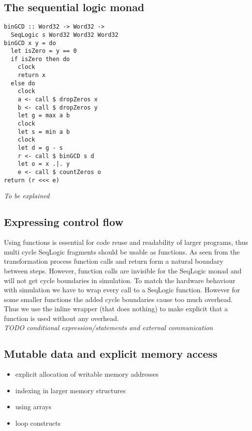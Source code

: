 \documentclass[preprint]{sigplanconf}
\begin{document}
\subsection{The sequential logic monad}

\begin{lstlisting}
binGCD :: Word32 -> Word32 -> 
  SeqLogic s Word32 Word32 Word32
binGCD x y = do
  let isZero = y == 0
  if isZero then do
    clock
    return x
  else do
    clock
    a <- call $ dropZeros x
    b <- call $ dropZeros y
    let g = max a b
    clock
    let s = min a b
    clock
    let d = g - s
    r <- call $ binGCD s d
    let o = x .|. y
    e <- call $ countZeros o
return (r <<< e)
\end{lstlisting}

\textit{To be explained}

\subsection{Expressing control flow}
Using functions is essential for code reuse and readability of larger programs, thus multi cycle SeqLogic fragments should be usable as functions.
As seen from the transformation process function calls and return form a natural boundary between steps.
However, function calls are invisible for the SeqLogic monad and will not get cycle boundaries in simulation.
To match the hardware behaviour with simulation we have to wrap every call to a SeqLogic function.
However for some smaller functions the added cycle boundaries cause too much overhead.
Thus we use the inline wrapper (that does nothing) to make explicit that a function is used without any overhead. \\

\textit {TODO conditional expression/statements and external communication}

\subsection{Mutable data and explicit memory access}
\begin{itemize}
  \item explicit allocation of writable memory addresses
  \item indexing in larger memory structures
  \item using arrays
  \item loop constructs
\end{itemize}
\end{document}
